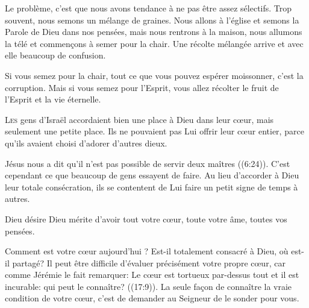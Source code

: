Le problème, c'est que nous avons tendance à ne pas être assez sélectifs.
 Trop souvent, nous semons un mélange de graines.
 Nous allons à l'église et semons la Parole de Dieu dans nos pensées,
 mais nous rentrons à la maison, nous allumons la télé et commen\c{c}ons à semer
 pour la chair. Une récolte mélangée arrive et avec elle beaucoup de confusion. 

Si vous semez pour la chair, tout ce que vous pouvez espérer moissonner,
 c'est la corruption. Mais si vous semez pour l'Esprit,
 vous allez récolter le fruit de l'Esprit et la vie éternelle. 

\dvrule







\lettrine{L}{es} gens d'Israël accordaient bien une place à Dieu
 dans leur c\oe{}ur, mais seulement une petite place.
 Ils ne pouvaient pas Lui offrir leur c\oe{}ur entier,
 parce qu'ils avaient choisi d'adorer d'autres dieux. 

Jésus nous a dit qu'il n'est pas possible de servir deux maîtres
 ((6:24)).
 C'est cependant ce que beaucoup de gens essayent de faire.
 Au lieu d'accorder à Dieu leur totale consécration,
 ils se contentent de Lui faire un petit signe de temps à autres. 


Dieu désire \ocadr Dieu mérite \fcadr{} d'avoir tout votre c\oe{}ur,
 toute votre âme, toutes vos pensées. 

Comment est votre c\oe{}ur aujourd'hui ? Est-il totalement consacré à Dieu,
 où est-il partagé? Il peut être difficile d'évaluer précisément
 votre propre c\oe{}ur, car comme Jérémie le fait remarquer:
 \Og Le c\oe{}ur est tortueux par-dessus tout et il est incurable:
 qui peut le connaître? \Fg{} ((17:9)).
 La seule fa\c{c}on de connaître la vraie condition de votre c\oe{}ur,
 c'est de demander au Seigneur de le sonder pour vous. 

